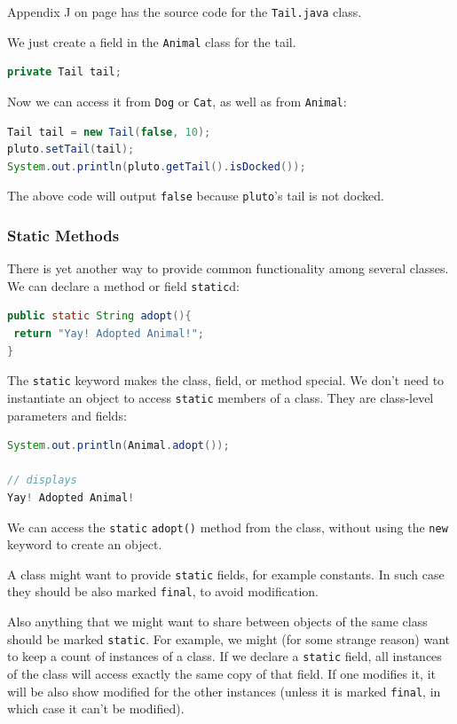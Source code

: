 Appendix J on page \pageref{App:AppendixJ} has the source code for the  \texttt{Tail.java} class.

We just create a field in the \texttt{Animal} class for the tail.
\begin{lstlisting}[language=Java]
private Tail tail;
\end{lstlisting}

Now we can access it from \texttt{Dog} or \texttt{Cat}, as well as from \texttt{Animal}:
\begin{lstlisting}[language=Java]
Tail tail = new Tail(false, 10);
pluto.setTail(tail);
System.out.println(pluto.getTail().isDocked());
\end{lstlisting}

The above code will output \texttt{false} because \texttt{pluto}'s tail is not docked.

\subsubsection{Static Methods}
There is yet another way to provide common functionality among several classes. We can declare a method or field \texttt{static}d:

\begin{lstlisting}[language=Java]
public static String adopt(){
 return "Yay! Adopted Animal!";
}
\end{lstlisting}

The \texttt{static} keyword makes the class, field, or method special. We don't need to instantiate an object to access \texttt{static} members of a class. They are class-level parameters and fields:
\begin{lstlisting}[language=Java]
System.out.println(Animal.adopt());

// displays
Yay! Adopted Animal!
\end{lstlisting}
We can access the \texttt{static} \texttt{adopt()} method from the class, without using the \texttt{new} keyword to create an object.

A class might want to provide \texttt{static} fields, for example constants. In such case they should be also marked \texttt{final}, to avoid modification.

Also anything that we might want to share between objects of the same class should be marked \texttt{static}. For example, we might (for some strange reason) want to keep a count of instances of a class. If we declare a \texttt{static} field, all instances of the class will access exactly the same copy of that field. If one modifies it, it will be also show modified for the other instances (unless it is marked \texttt{final}, in which case it can't be modified).

